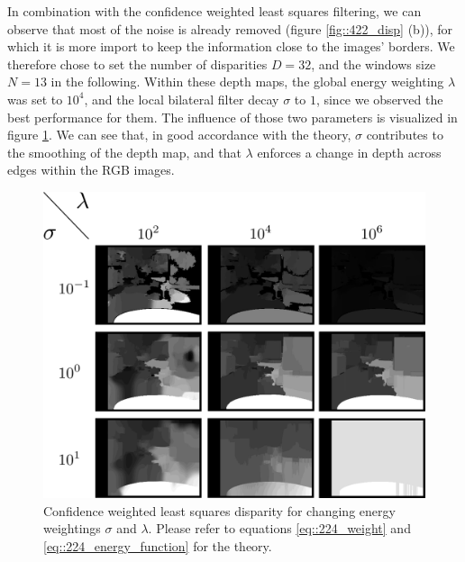 In combination with the confidence weighted least squares filtering, we can observe that most of the noise is already removed (figure \ref{fig::422_disp} (b)), for which it is more import to keep the information close to the images' borders. We therefore chose to set the number of disparities $D=32$, and the windows size $N=13$ in the following. Within these depth maps, the global energy weighting $\lambda$ was set to $10^4$, and the local bilateral filter decay $\sigma$ to $1$, since we observed the best performance for them. The influence of those two parameters is visualized in figure \ref{fig::422_sigma_lambda}. We can see that, in good accordance with the theory, $\sigma$ contributes to the smoothing of the depth map, and that $\lambda$ enforces a change in depth across edges within the RGB images.
\begin{figure}[h!]
	\centering
	\includegraphics[scale=.2]{chapters/04_experiments/02_autonomous_walking/02_depth_map_parameter_tuning/sigma_lambda.png}
	\caption{Confidence weighted least squares disparity for changing energy weightings $\sigma$ and $\lambda$. Please refer to equations \ref{eq::224_weight} and \ref{eq::224_energy_function} for the theory.}
	\label{fig::422_sigma_lambda}
\end{figure}
